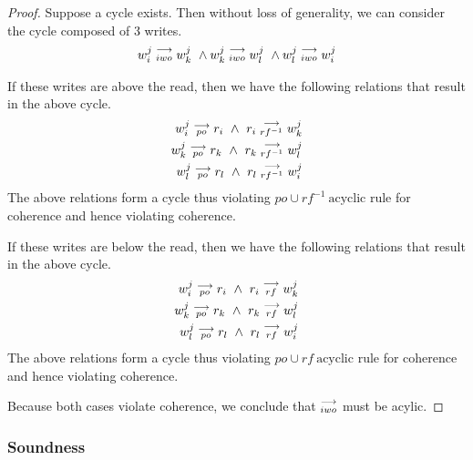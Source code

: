     \begin{proof}
        Suppose a cycle exists. Then without loss of generality, we can consider the cycle composed of 3 writes.
        \begin{align}
            \reln{w_i^j}{iwo}{w_k^j} \ \wedge \reln{w_k^j}{iwo}{w_l^j} \ \wedge \reln{w_l^j}{iwo}{w_i^j}  
        \end{align}
        
        If these writes are above the read, then we have the following relations that result in the above cycle.
        \begin{align}
            w_i^j\stackrel{\longrightarrow}{_{po}}r_i \ \wedge \ r_i\stackrel{\longrightarrow}{_{rf^{-1}}}w_k^j \\
            w_k^j\stackrel{\longrightarrow}{_{po}}r_k \ \wedge \ r_k\stackrel{\longrightarrow}{_{rf^{-1}}}w_l^j \\
            w_l^j\stackrel{\longrightarrow}{_{po}}r_l \ \wedge \ r_l\stackrel{\longrightarrow}{_{rf^{-1}}}w_i^j 
        \end{align}
        The above relations form a cycle thus violating $po \cup rf^{-1} \ \text{acyclic}$ rule for coherence and hence violating coherence.
        
        If these writes are below the read, then we have the following relations that result in the above cycle.
        \begin{align}
            w_i^j\stackrel{\longrightarrow}{_{po}}r_i \ \wedge \ r_i\stackrel{\longrightarrow}{_{rf}}w_k^j \\
            w_k^j\stackrel{\longrightarrow}{_{po}}r_k \ \wedge \ r_k\stackrel{\longrightarrow}{_{rf}}w_l^j \\
            w_l^j\stackrel{\longrightarrow}{_{po}}r_l \ \wedge \ r_l\stackrel{\longrightarrow}{_{rf}}w_i^j 
        \end{align}
        The above relations form a cycle thus violating $po \cup rf \ \text{acyclic}$ rule for coherence and hence violating coherence.

        Because both cases violate coherence, we conclude that $\stackrel{\longrightarrow}{_{iwo}}$ must be acylic. 

    \end{proof}



    \subsubsection{Soundness}

